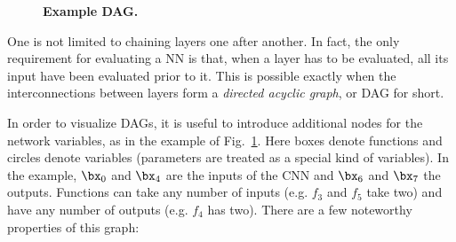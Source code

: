 \begin{figure}[t]
\begin{center}
\end{center}
\vspace{-1em}
\caption{\textbf{Example DAG.}}\label{f:dag}
\end{figure}

One is not limited to chaining layers one after another. In fact, the only requirement for evaluating a NN is that, when a layer has to be evaluated, all its input have been evaluated prior to it. This is possible exactly when the interconnections between layers form a \emph{directed acyclic graph}, or DAG for short.

In order to visualize DAGs, it is useful to introduce additional nodes for the network variables, as in the  example of Fig.~\ref{f:dag}. Here boxes denote functions and circles denote variables (parameters are treated as a special kind of variables). In the example, $\bx_0$ and $\bx_4$ are the inputs of the CNN and $\bx_6$ and $\bx_7$ the outputs. Functions can take any number of inputs (e.g. $f_3$ and $f_5$ take two) and have any number of outputs (e.g. $f_4$ has two). There are a few noteworthy properties of this graph:

